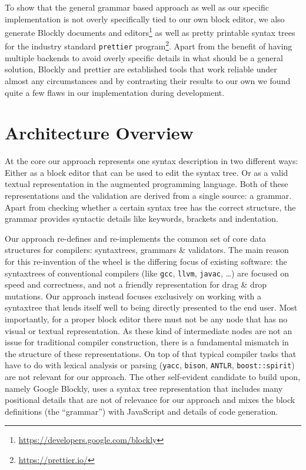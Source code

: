 \documentclass[sigconf,natbib=false]{acmart}
\newcommand\todo[1]{{\bfseries ToDo: #1}}
\begin{document}
To show that the general grammar based approach as well as our specific implementation is not overly specifically tied to our own block editor, we also generate Blockly documents and editors\footnote{\url{https://developers.google.com/blockly}} as well as pretty printable syntax trees for the industry standard \texttt{prettier} program\footnote{\url{https://prettier.io/}}. Apart from the benefit of having multiple backends to avoid overly specific details in what should be a general solution, Blockly and prettier are established tools that work reliable under almost any circumstances and by contrasting their results to our own we found quite a few flaws in our implementation during development.

\section{Architecture Overview}

At the core our approach represents one syntax description in two different ways: Either as a block editor that can be used to edit the syntax tree. Or as a valid textual representation in the augmented programming language. Both of these representations and the validation are derived from a single source: a grammar. Apart from checking whether a certain syntax tree has the correct structure, the grammar provides syntactic details like keywords, brackets and indentation.

Our approach re-defines and re-implements the common set of core data structures for compilers: syntax\-trees, grammars \& validators. The main reason for this re-invention of the wheel is the differing focus of existing software: the syntaxtrees of conventional compilers (like \texttt{gcc}, \texttt{llvm}, \texttt{javac}, …) are focused on speed and correctness, and not a friendly representation for drag \& drop mutations. Our approach instead focuses exclusively on working with a syntaxtree that lends itself well to being directly presented to the end user. Most importantly, for a proper block editor there must not be any node that has no visual or textual representation. As these kind of intermediate nodes are not an issue for traditional compiler construction, there is a fundamental mismatch in the structure of these representations. On top of that typical compiler tasks that have to do with lexical analysis or parsing (\texttt{yacc}, \texttt{bison}, \texttt{ANTLR}, \texttt{boost::spirit}) are not relevant for our approach. The other self-evident candidate to build upon, namely Google Blockly, uses a syntax tree representation that includes many positional details that are not of relevance for our approach and mixes the block definitions (the \enquote{grammar}) with JavaScript and details of code generation.
\end{document}
